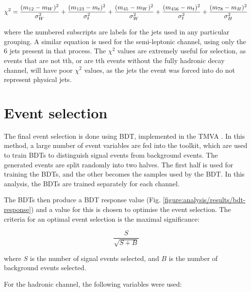 \begin{equation}
  \centering
	\chi^2 = \frac{(m_{12} - m_W)^2}{\sigma^2_W} + \frac{(m_{123} - m_t)^2}{\sigma^2_{t}} + \frac{(m_{45} - m_W)^2}{\sigma^2_W} + \frac{(m_{456} - m_t)^2}{\sigma^2_{t}} + \frac{(m_{78} - m_H)^2}{\sigma^2_H}
\label{eq:chi-square}
\end{equation}

where the numbered subscripts are labels for the jets used in any particular grouping. A similar equation is used for the semi-leptonic channel, using only the 6 jets present in that process. The $\chi^2$ values are extremely useful for selection, as events that are not tth, or are tth events without the fully hadronic decay channel, will have poor $\chi^2$ values, as the jets the event was forced into do not represent physical jets.

\section{Event selection}
The final event selection is done using \acrfull{BDT}, implemented in the \acrfull{TMVA} \cite{tmva}. In this method, a large number of event variables are fed into the toolkit, which are used to train \acrshort{BDT}s to distinguish signal events from background events. The generated events are split randomly into two halves. The first half is used for training the \acrshort{BDT}s, and the other becomes the samples used by the \acrshort{BDT}. In this analysis, the \acrshort{BDT}s are trained separately for each channel. 

The \acrshort{BDT}s then produce a \acrshort{BDT} response value (Fig. \ref{figure:analysis/results/bdt-response}) and a value for this is chosen to optimise the event selection. The criteria for an optimal event selection is the maximal significance:

\begin{equation}
	\frac{S}{\sqrt{S + B}}
\label{eq:significance}
\end{equation}

where $S$ is the number of signal events selected, and $B$ is the number of background events selected.

For the hadronic channel, the following variables were used:

